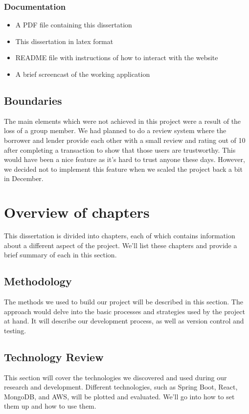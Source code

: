 \subsubsection{Documentation}
\begin{itemize}
\item A PDF file containing this dissertation
\item This dissertation in latex format
\item README file with instructions of how to interact with the website
\item A brief screencast of the working application
\end{itemize}
 
\subsection{Boundaries}
The main elements which were not achieved in this project were a result of the loss of a group member. We had planned to do a review system where the borrower and lender provide each other with a small review and rating out of 10 after completing a transaction to show that those users are trustworthy. This would have been a nice feature as it's hard to trust anyone these days. However, we decided not to implement this feature when we scaled the project back a bit in December.  

\section{Overview of chapters}
This dissertation is divided into chapters, each of which contains information about a different aspect of the project. We'll list these chapters and provide a brief summary of each in this section. 

\subsection{Methodology}
The methods we used to build our project will be described in this section. The approach would delve into the basic processes and strategies used by the project at hand. It will describe our development process, as well as version control and testing.  

\subsection{Technology Review}
This section will cover the technologies we discovered and used during our research and development. Different technologies, such as Spring Boot, React, MongoDB, and AWS, will be plotted and evaluated. We'll go into how to set them up and how to use them. 

